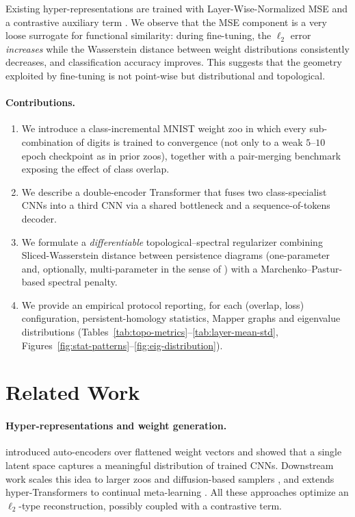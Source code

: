 \documentclass{article}
\begin{document}
Existing hyper-representations are trained with Layer-Wise-Normalized MSE
and a contrastive auxiliary term
\citep{schurholtSelfSupervisedRepresentationLearning2021}.  We observe that
the MSE component is a very loose surrogate for functional similarity:
during fine-tuning, the $\ell_2$ error \emph{increases} while the
Wasserstein distance between weight distributions consistently decreases,
and classification accuracy improves.  This suggests that the geometry
exploited by fine-tuning is not point-wise but distributional and
topological.

\paragraph{Contributions.}
\begin{enumerate}[leftmargin=*,topsep=2pt,itemsep=1pt]
  \item We introduce a class-incremental MNIST weight zoo in which every
  sub-combination of digits is trained to convergence (not only to a weak
  $5$--$10$ epoch checkpoint as in prior zoos), together with a
  pair-merging benchmark exposing the effect of class overlap.
  \item We describe a double-encoder Transformer that fuses two class-specialist
  CNNs into a third CNN via a shared bottleneck and a sequence-of-tokens
  decoder.
  \item We formulate a \emph{differentiable} topological--spectral
  regularizer combining Sliced-Wasserstein distance between persistence
  diagrams (one-parameter and, optionally, multi-parameter in the sense
  of \citet{scoccolaDifferentiabilityOptimizationMultiparameter2024}) with
  a Marchenko--Pastur-based spectral penalty.
  \item We provide an empirical protocol reporting, for each
  (overlap, loss) configuration, persistent-homology statistics, Mapper
  graphs and eigenvalue distributions (Tables~\ref{tab:topo-metrics}--\ref{tab:layer-mean-std},
  Figures~\ref{fig:stat-patterns}--\ref{fig:eig-distribution}).
\end{enumerate}


\section{Related Work}
\label{sec:related}

\paragraph{Hyper-representations and weight generation.}
\citet{schurholtSelfSupervisedRepresentationLearning2021} introduced
auto-encoders over flattened weight vectors and showed that a single latent
space captures a meaningful distribution of trained CNNs.  Downstream work
scales this idea to larger zoos and diffusion-based samplers
\citep{schurholtHyperRepresentationsLearningPopulations2024,HyperRepresentationsGenerativeModels2025,soroDiffusionBasedNeuralNetwork2024,knyazevAcceleratingTrainingNeuron2025},
and extends hyper-Transformers to continual meta-learning
\citep{vladymyrovContinualHyperTransformerMetaLearner2024}.  All these
approaches optimize an $\ell_2$-type reconstruction, possibly coupled
with a contrastive term.
\end{document}
